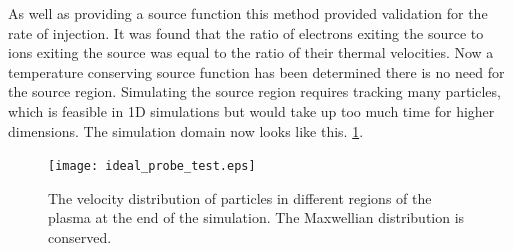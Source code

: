 As well as providing a source function this method provided validation for the rate of injection. It was found that the ratio of electrons exiting the source to ions exiting the source was equal to the ratio of their thermal velocities. Now a temperature conserving source function has been determined there is no need for the source region. Simulating the source region requires tracking many particles, which is feasible in 1D simulations but would take up too much time for higher dimensions. The simulation domain now looks like this.
\ref{fig:maxwell_maintained}.
\begin{figure}[H]
\centering
\texttt{[image: ideal\_probe\_test.eps]}
\caption{The velocity distribution of particles in different regions of the plasma at the end of the simulation. The Maxwellian distribution is conserved.}
\label{fig:maxwell_maintained}
\end{figure}




